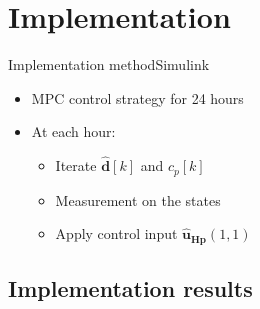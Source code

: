 \section{Implementation}



%     

%     


\begin{frame}{Implementation method}{Simulink}
\begin{itemize}
\item<1-> MPC control strategy for 24 hours
\item<1-> At each hour:
	 	\begin{itemize}
	 	\item<1-> Iterate $\hat{\pmb{d}}[k]$ and $c_p [k]$
	 	\item<1-> Measurement on the states 
	 	\item<1-> Apply control input $\pmb{\hat{u}_{Hp}}(1,1)$
	 	\end{itemize}
\end{itemize}

\begin{figure}[H]
\centering
 
\end{figure}

\end{frame}


\subsection{Implementation results}

